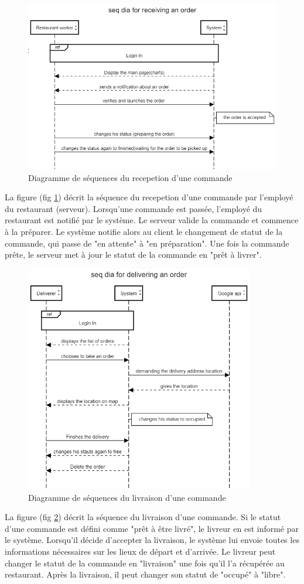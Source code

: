 \documentclass[french, a4paper, 12pt]{report}
\begin{document}
			\newpage	
			\begin{figure}[!h]
  				\center
  				\includegraphics[width=12cm]{seqrest.png}
  				\caption{Diagramme de séquences du recepetion d'une commande}
  				\label{fig:seqrest}
			\end{figure} La figure (fig \ref{fig:seqrest}) décrit la séquence du recepetion d'une commande par l'employé du restaurant (serveur). Lorsqu'une commande est passée, l'employé du restaurant est notifié par le système. Le serveur valide la commande et commence à la préparer. Le système notifie alors au client le changement de statut de la commande, qui passe de "en attente" à "en préparation".
Une fois la commande prête, le serveur met à jour le statut de la commande en "prêt à livrer".
			
			\newpage	
			\begin{figure}[!h]
  				\center
  				\includegraphics[width=10cm]{seqdeliver.png}
  				\caption{Diagramme de séquences du livraison d'une commande}
  				\label{fig:seqdeliver}
			\end{figure} La figure (fig \ref{fig:seqdeliver}) décrit la séquence du livraison d'une commande. Si le statut d'une commande est défini comme "prêt à être livré", le livreur en est informé par le système.
Lorsqu'il décide d'accepter la livraison, le système lui envoie toutes les informations nécessaires sur les lieux de départ et d'arrivée.
Le livreur peut changer le statut de la commande en "livraison" une fois qu'il l'a récupérée au restaurant.
Après la livraison, il peut changer son statut de "occupé" à "libre".
\end{document}
